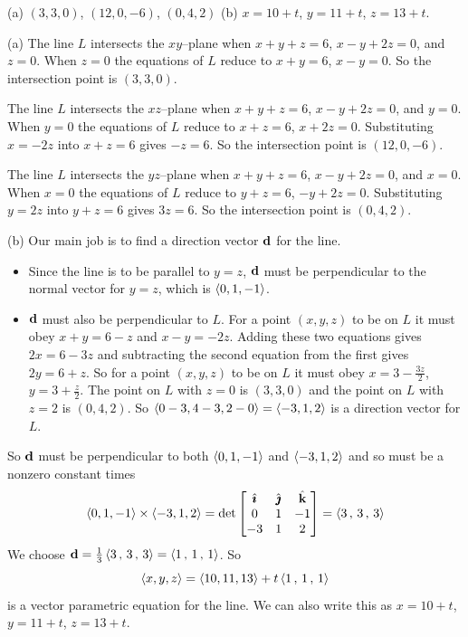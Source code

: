 %

\begin{answer}
(a) $(3,3,0)$,  $(12,0,-6)$, $(0,4,2)$ \qquad
(b) $x=10+t$, $y=11+t$, $z=13+t$.
\end{answer}

\begin{solution}
(a)
The line $L$ intersects the $xy$--plane when 
$x + y + z = 6$,
$x - y + 2z = 0$,
and $z=0$. When $z=0$ the equations of $L$ reduce to 
$x + y = 6$,
$x - y = 0$.
So the intersection point is $(3,3,0)$.

The line $L$ intersects the $xz$--plane when 
$x + y + z = 6$,
$x - y + 2z = 0$,
and $y=0$. When $y=0$ the equations of $L$ reduce to 
$x + z = 6$,
$x +2z = 0$.
Substituting $x=-2z$ into $x+z=6$ gives $-z=6$.
So the intersection point is $(12,0,-6)$.

The line $L$ intersects the $yz$--plane when 
$x + y + z = 6$,
$x - y + 2z = 0$,
and $x=0$. When $x=0$ the equations of $L$ reduce to 
$y + z = 6$,
$-y +2z = 0$.
Substituting $y=2z$ into $y+z=6$ gives $3z=6$.
So the intersection point is $(0,4,2)$.

(b)
Our main job is to find a direction vector $\mathbf{d}$ for the line.
\begin{itemize}
\item
Since the line is to be parallel to $y=z$, $\mathbf{d}$ must be perpendicular
to the normal vector for $y=z$, which is $\left< 0,1,-1\right>$. 
\item
$\mathbf{d}$ must also be perpendicular to $L$. For a point $(x,y,z)$ to be on $L$
it must obey $x+y = 6-z$ and $x-y =-2z$. Adding these two equations
gives $2x=6-3z$ and subtracting the second equation from the first
gives $2y= 6+z$. So for a point $(x,y,z)$ to be on $L$ it must obey 
$x=3-\frac{3z}{2}$, $y=3+\frac{z}{2}$. The point on $L$ with $z=0$
is $(3,3,0)$ and the point on $L$ with $z=2$ is $(0,4,2)$. So
 $\left< 0-3,4-3,2-0 \right>=\left< -3,1,2 \right>$ is a direction vector for $L$.
\end{itemize}
So $\mathbf{d}$ must be perpendicular to both $\left< 0,1,-1\right>$
and $\left< -3,1,2 \right>$ and so must be a nonzero constant times
\begin{align*}
\left< 0,1,-1\right> \times \left< -3,1,2 \right>
    =\det\left[\begin{matrix}
            \hat{\pmb{\imath}}  &  \hat{\pmb{\jmath}}  &  \hat{\mathbf{k}} \\
            0    &   1   &   -1 \\
            -3    &   1   &    2 
            \end{matrix}\right]
=\left< 3 \,,\, 3 \,,\, 3 \right>
\end{align*}
We choose $\mathbf{d}=\frac{1}{3}\left< 3 \,,\, 3 \,,\, 3 \right>=\left< 1\,,\,1\,,\,1 \right>$.
So 
\begin{equation*}
\left< x,y,z\right> = \left< 10,11,13\right> + t \left< 1\,,\,1\,,\,1 \right>
\end{equation*}
is a vector parametric equation for the line. We can also write this as
$x=10+t$, $y=11+t$, $z=13+t$.
\end{solution}

